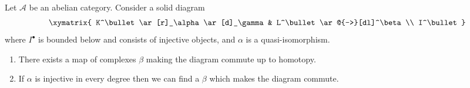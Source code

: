 \begin{lemma}
\label{lemma-morphisms-lift}
Let $\mathcal{A}$ be an abelian category.
Consider a solid diagram
$$
\xymatrix{
K^\bullet \ar[r]_\alpha \ar[d]_\gamma & L^\bullet \ar@{-->}[dl]^\beta \\
I^\bullet
}
$$
where $I^\bullet$ is bounded below and consists of injective
objects, and $\alpha$ is a quasi-isomorphism.
\begin{enumerate}
\item There exists a map of complexes $\beta$ making the diagram
commute up to homotopy.
\item If $\alpha$ is injective in every degree
then we can find a $\beta$ which makes the diagram commute.
\end{enumerate}
\end{lemma}

